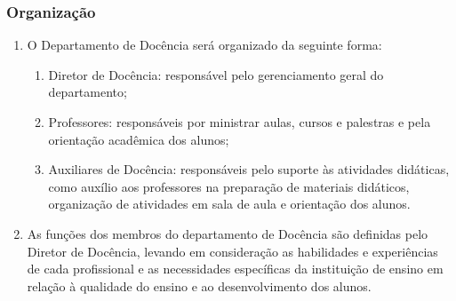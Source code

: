         \subsubsection{Organização}
        \begin{enumerate}
            \item O Departamento de Docência será organizado da seguinte forma:
            \begin{enumerate}
                \item  Diretor de Docência: responsável pelo gerenciamento geral do departamento;
                \item Professores: responsáveis por ministrar aulas, cursos e palestras e pela orientação acadêmica dos alunos;
                \item Auxiliares de Docência: responsáveis pelo suporte às atividades didáticas, como auxílio aos professores na preparação de materiais didáticos, organização de atividades em sala de aula e orientação dos alunos.
            \end{enumerate}
            \item As funções dos membros do departamento de Docência são definidas pelo Diretor de Docência, levando em consideração as habilidades e experiências de cada profissional e as necessidades específicas da instituição de ensino em relação à qualidade do ensino e ao desenvolvimento dos alunos.
        \end{enumerate}
